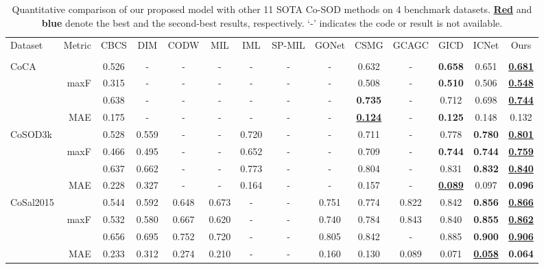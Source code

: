 \documentclass[10pt,twocolumn,letterpaper]{article}
\def\blu#1{\textbf{\color{blue} #1}} \def\red#1{\textbf{\color{red}\underline{#1}}}
\begin{document}
\begin{table*}[t]
  \centering
  \footnotesize
  \renewcommand{\arraystretch}{1.0}
  \renewcommand{\tabcolsep}{2.2mm}
 \caption{Quantitative comparison of our proposed model with other 11 SOTA Co-SOD methods on 4 benchmark datasets. \red{Red} and \blu{blue} denote the best and the second-best results, respectively. `-' indicates the code or result is not available.}
  \begin{tabular}{lr|ccccccccccc|c}
  \hline

    Dataset
    & Metric
    & CBCS  & DIM & CODW & MIL & IML  & SP-MIL & GONet & CSMG & GCAGC & GICD & ICNet & Ours \\
    &
    & \cite{fu2013cluster} &\cite{zhang2015cosaliency} & \cite{zhang2015co}   & \cite{zhang2015self} & \cite{ren2020co}& \cite{zhang2016co} & \cite{hsu2018unsupervised} & \cite{zhang2019co} & \cite{zhang2020adaptive} &\cite{zhang2020gicd} &\cite{jin2020icnet} &\\ \hline
  \multirow{4}{*}{CoCA}
    &     &0.526 &- &- &-	&-	&-	&-	&0.632	&-	&\blu{0.658}	&0.651	&\red{0.681}\\
    & maxF  &0.315 &-	&-	&-	&-	&-	&-	&0.508	&-	&\blu{0.510}	&0.506	&\red{0.548}\\
    &   &0.638	&-	&-	&-	&-	&-	&-	&\blu{0.735}	&-	&0.712	&0.698	&\red{0.744}\\
  \cite{zhang2020gicd}& MAE &0.175	&-	&-	&-	&-	&-	&-	&\red{0.124}	&-	&\blu{0.125}	&0.148	&0.132\\
     \hline
  \multirow{4}{*}{CoSOD3k}
    &   &0.528	&0.559	&-	&-	&0.720	&-	&-	&0.711	&-	&0.778	&\blu{0.780}	&\red{0.801} \\
    & maxF  &0.466 &0.495	&-	&-	&0.652	&-	&-	&0.709	&-	&\blu{0.744}	&\blu{0.744}	&\red{0.759}\\
    &  &0.637 &0.662	&-	&-	&0.773	&-	&-	&0.804	&-	&0.831	&\blu{0.832}	&\red{0.840}\\
  \cite{fan2020taking}& MAE &0.228 &0.327 &- &-	&0.164	&-	&-	&0.157	&-	&\red{0.089}	&0.097	&\blu{0.096}\\
     \hline
  \multirow{4}{*}{CoSal2015}
    &    &0.544 &0.592	&0.648 &0.673	&-	&-	&0.751	&0.774	&0.822	&0.842	&\blu{0.856} &\red{0.866} \\
    & maxF  &0.532 &0.580	&0.667 &0.620	&-	&-	&0.740	&0.784	&0.843	&0.840	&\blu{0.855} &\red{0.862}\\
    &  &0.656 &0.695	&0.752 &0.720	&-	&-	&0.805	&0.842	&-	&0.885	&\blu{0.900} &\red{0.906} \\
    \cite{zhang2015co}& MAE &0.233 &0.312 &0.274 &0.210	&-	&-	&0.160	&0.130	&0.089	&0.071	&\red{0.058} &\blu{0.064}\\

\end{tabular}
\end{table*}
\end{document}
